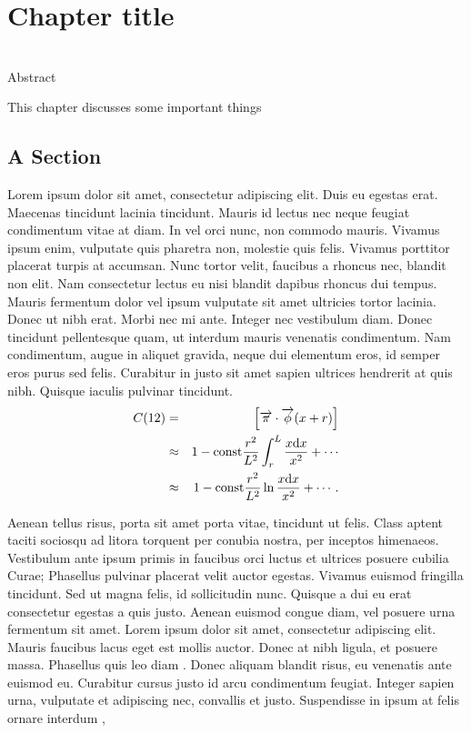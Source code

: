 \chapter{Chapter title}

\begin{bf}
  \author{Author Name}\\
  
Abstract\\
\end{bf}

This chapter discusses some important things


\section{A Section}

Lorem ipsum dolor sit amet, consectetur adipiscing elit. Duis eu egestas erat. Maecenas tincidunt lacinia tincidunt. Mauris id lectus nec neque feugiat condimentum vitae at diam. In vel orci nunc, non commodo mauris. Vivamus ipsum enim, vulputate quis pharetra non, molestie quis felis. Vivamus porttitor placerat turpis at accumsan. Nunc tortor velit, faucibus a rhoncus nec, blandit non elit. Nam consectetur lectus eu nisi blandit dapibus rhoncus dui tempus. Mauris fermentum dolor vel ipsum vulputate sit amet ultricies tortor lacinia. Donec ut nibh erat. Morbi nec mi ante. Integer nec vestibulum diam. Donec tincidunt pellentesque quam, ut interdum mauris venenatis condimentum. Nam condimentum, augue in aliquet gravida, neque dui elementum eros, id semper eros purus sed felis. Curabitur in justo sit amet sapien ultrices hendrerit at quis nibh. Quisque iaculis pulvinar tincidunt. 
\begin{eqnarray}
C(12) &= &\left[\overrightarrow{\pi}\cdot\overrightarrow{\phi}(x+r)\right] \nonumber \\ 
&\approx& 1-\mathrm{const}\frac{r^2}{L^2}\int_r^L\frac{x\mathrm{d} x}{x^2} + \cdots \nonumber  \\
&\approx& 1-\mathrm{const}\frac{r^2}{L^2}\ln\frac{x\mathrm{d} x}{x^2} + \cdots .\label{brokenlongeqn}
\end{eqnarray}

Aenean tellus risus, porta sit amet porta vitae, tincidunt ut felis. Class aptent taciti sociosqu ad litora torquent per conubia nostra, per inceptos himenaeos. Vestibulum ante ipsum primis in faucibus orci luctus et ultrices posuere cubilia Curae; Phasellus pulvinar placerat velit auctor egestas. Vivamus euismod fringilla tincidunt. Sed ut magna felis, id sollicitudin nunc. Quisque a dui eu erat consectetur egestas a quis justo. Aenean euismod congue diam, vel posuere urna fermentum sit amet. Lorem ipsum dolor sit amet, consectetur adipiscing elit. Mauris faucibus lacus eget est mollis auctor. Donec at nibh ligula, et posuere massa. Phasellus quis leo diam \cite{diamantaras1996pcn}.
Donec aliquam blandit risus, eu venenatis ante euismod eu. Curabitur cursus justo id arcu condimentum feugiat. Integer sapien urna, vulputate et adipiscing nec, convallis et justo. Suspendisse in ipsum at felis ornare interdum \cite{tulone2006pts},

